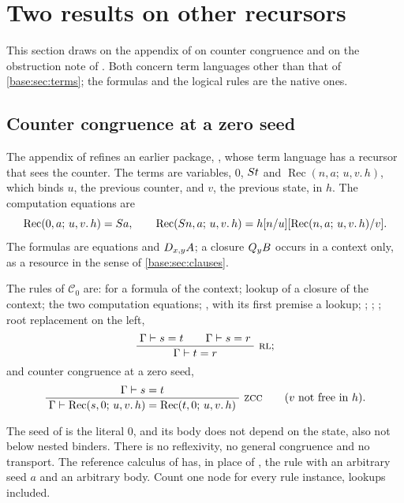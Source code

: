 \section{Two results on other recursors}
\label{kern:sec:recursors}

This section draws on the appendix of  on counter
congruence and on the obstruction note of .  Both
concern term languages other than that of \cref{base:sec:terms}; the
formulas and the logical rules are the native ones.

\subsection{Counter congruence at a zero seed}
\label{kern:sec:zcc}

The appendix of  refines an earlier package,
, whose term language has a recursor that sees the
counter.  The terms are variables, $0$, $S t$ and
$\operatorname{Rec}(n,a;\,u,v.\,h)$, which binds $u$, the previous counter,
and $v$, the previous state, in $h$.  The computation equations are
\[
 \operatorname{Rec}(0,a;\,u,v.\,h)=S a,\qquad
 \operatorname{Rec}(S n,a;\,u,v.\,h)
  =h[n/u][\operatorname{Rec}(n,a;\,u,v.\,h)/v].
\]
The formulas are equations and $D_{x,y}A$; a closure $Q_{y}B$ occurs in a
context only, as a resource in the sense of \cref{base:sec:clauses}.

\begin{definition}
\label{kern:def:C0}
The rules of $\mathcal{C}_0$ are:  for a formula of the
context; lookup of a closure of the context; the two computation equations;
, with its first premise a lookup; ;
; ; root replacement on the left,
\[
 \infrule{\Gamma\proves s=t\qquad\Gamma\proves s=r}{\Gamma\proves t=r}\
 \rulename{RL};
\]
and counter congruence at a zero seed,
\[
 \infrule{\Gamma\proves s=t}
  {\Gamma\proves\operatorname{Rec}(s,0;\,u,v.\,h)
               =\operatorname{Rec}(t,0;\,u,v.\,h)}\ \rulename{ZCC}
 \qquad(v\text{ not free in }h).
\]
\end{definition}

The seed of  is the literal $0$, and its body does not depend
on the state, also not below nested binders.  There is no reflexivity, no
general congruence and no transport.  The reference calculus of
 has, in place of , the rule
\rulename{CC} with an arbitrary seed $a$ and an arbitrary body.  Count one
node for every rule instance, lookups included.

